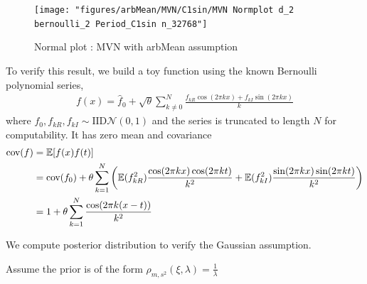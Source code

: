 \documentclass{iitthesis}          %
\newcommand{\Ex}{\mathbb{E}}
\newcommand{\cov}{{\textup{cov}}}
\newcommand{\calN}{\mathcal{N}}
\begin{document}
{{{{{{\begin{figure}[ht]
	\centering
	\texttt{[image: "figures/arbMean/MVN/C1sin/MVN Normplot d\_2 bernoulli\_2 Period\_C1sin n\_32768"]}
	\caption{Normal plot : MVN with arbMean assumption}
	\label{fig:mvn-normplot}
\end{figure}
\fi
To verify this result, we build a toy function using the known Bernoulli polynomial series,
\begin{align*}
f(x) = \hat{f}_0 + \sqrt{\theta} \sum_{k \neq 0}^N 
\frac{f_{kR} \cos(2\pi k x) + f_{kI} \sin(2\pi k x)}{k}
\end{align*}
where $f_0, f_{kR}, f_{kI} \sim \text{IID} \calN(0, 1) $ and the series is truncated to length $N$ for computability. It has zero mean and covariance
\begin{align*}
\cov(f) &= \Ex[f(x) f(t)] \\
&= \cov(f_0) + \theta \sum_{k=1}^N 
\left(	
\Ex(f_{kR}^2) \frac{\cos(2\pi k x) \cos(2\pi k t)}{k^2} +
\Ex(f_{kI}^2) \frac{\sin(2\pi k x) \sin(2\pi k t)}{k^2} \right) \\
&= 1 + \theta \sum_{k=1}^N 	
 \frac{\cos(2\pi k (x - t)) }{k^2} 
\end{align*}




 We compute posterior distribution to verify the Gaussian assumption.

Assume the prior is of the form $ \rho_{m,s^2} (\xi, \lambda) = \frac{1}{\lambda} $ 

}}}}}}
\end{document}
